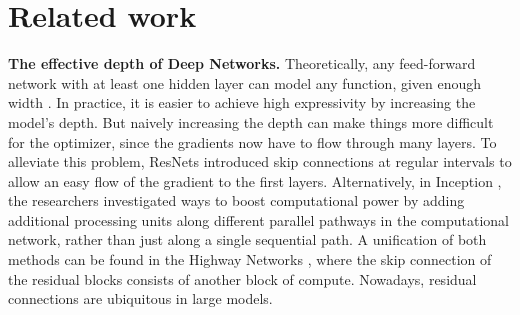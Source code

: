 \section{Related work}
\textbf{The effective depth of Deep Networks.} Theoretically, any feed-forward network with at least one hidden layer can model any function, given enough width \citep{Pinkus_1999}. In practice, it is easier to achieve high expressivity by increasing the model's depth. But naively increasing the depth can make things more difficult for the optimizer, since the gradients now have to flow through many layers. To alleviate this problem, ResNets \citep{he2015deepresiduallearningimage} introduced skip connections at regular intervals to allow an easy flow of the gradient to the first layers. Alternatively, in Inception \citep{szegedy2014goingdeeperconvolutions}, the researchers investigated ways to boost computational power by adding additional processing units along different parallel pathways in the computational network, rather than just along a single sequential path. A unification of both methods can be found in the Highway Networks \citep{srivastava2015highwaynetworks}, where the skip connection of the residual blocks consists of another block of compute. Nowadays, residual connections are ubiquitous in large models.


